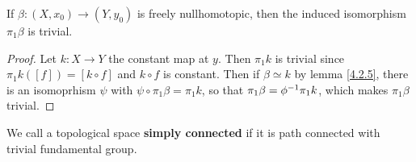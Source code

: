 \begin{corollary}
    If $\beta:(X,x_0) \xrightarrow{} (Y,y_0)$ is freely nullhomotopic, then the
    induced isomorphism $\pi_1{\beta}$ is trivial.
\end{corollary}
\begin{proof}
    Let $k:X \xrightarrow{} Y$ the constant map at $y$. Then  $\pi_1{k}$ is
    trivial since $\pi_1{k}([f])=[k \circ f]$ and $k \circ f$ is constant. Then
    if  $\beta \simeq k$ by lemma \ref{4.2.5}, there is an isomoprhism $\psi$
    with  $\psi \circ \pi_1{\beta}=\pi_1{k}$, so that
    $\pi_1{\beta}=\phi^{-1}\pi_1{k}$, which makes $\pi_1{\beta}$ trivial.
\end{proof}

\begin{definition}
    We call a topological space \textbf{simply connected} if it is path
    connected with trivial fundamental group.
\end{definition}
